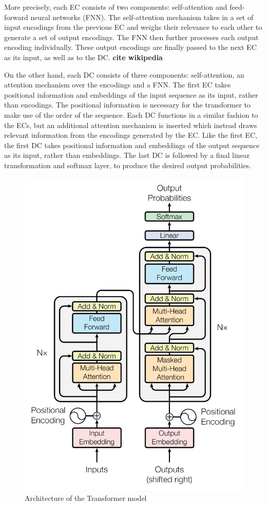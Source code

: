 \documentclass[11pt,a4paper]{article}
\begin{document}
More precisely, each EC consists of two components: self-attention and feed-forward neural networks (FNN). The self-attention mechanism takes in a set of input encodings from the previous EC and weighs their relevance to each other to generate a set of output encodings. The FNN then further processes each output encoding individually. These output encodings are finally passed to the next EC as its input, as well as to the DC. \textbf{cite wikipedia}

On the other hand, each DC consists of three components: self-attention, an attention mechanism over the encodings and a FNN. The first EC takes positional information and embeddings of the input sequence as its input, rather than encodings. The positional information is necessary for the transformer to make use of the order of the sequence. Each DC functions in a similar fashion to the ECs, but an additional attention mechanism is inserted which instead draws relevant information from the encodings generated by the EC. Like the first EC, the first DC takes positional information and embeddings of the output sequence as its input, rather than embeddings. The last DC is followed by a final linear transformation and softmax layer, to produce the desired output probabilities.

\begin{figure}[h]
    \centering
    \includegraphics[scale=0.5]{images/Transformer.PNG}
    \caption{Architecture of the Transformer model}
    \label{fig:transformer}
\end{figure}
\end{document}
